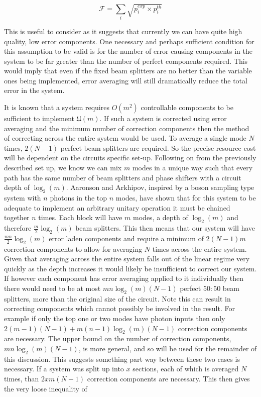 \documentclass[aps,pra,twocolumn,superscriptaddress,numerical]{revtex4-1}
\begin{document}
		\begin{equation}
			\mathcal{F}=\sum_{i}\sqrt{p_{i}^{exp}\times p_{i}^{th}}
		\end{equation}
		
		
		This is useful to consider as it suggests that currently we can have quite high quality, low error components. One necessary and perhaps sufficient condition for this assumption to be valid is for the number of error causing components in the system to be far greater than the number of perfect components required. This would imply that even if the fixed beam splitters are no better than the variable ones being implemented, error averaging will still dramatically reduce the total error in the system. 
		
		It is known \cite{reck} that a system requires $O\left(m^{2}\right)$ controllable components to be sufficient to implement $\mathfrak{U}\left(m\right)$. If such a system is corrected using error averaging and the minimum number of correction components then the method of correcting across the entire system would be used. To average a single mode $N$ times, $2\left(N-1\right)$ perfect beam splitters are required. So the precise resource cost will be dependent on the circuits specific set-up. Following on from the previously described set up, we know we can mix $m$ modes in a unique way such that every path has the same number of beam splitters and phase shifters with a circuit depth of $\log_{2}\left(m\right)$. Aaronson and Arkhipov, inspired by a boson sampling type system with $n$ photons in the top $n$ modes, have shown \cite{Boson} that for this system to be adequate to implement an arbitrary unitary operation it must be chained together $n$ times. Each block will have $m$ modes, a depth of $\log_{2}\left(m\right)$ and therefore $\frac{m}{2}\log_{2}\left(m\right)$ beam splitters.	This then means that our system will have $\frac{mn}{2}\log_{2}\left(m\right)$ error laden components and require a minimum of $2\left(N-1\right)m$ correction components to allow for averaging $N$ times across the entire system. Given that averaging across the entire system falls out of the linear regime very quickly as the depth increases it would likely	be insufficient to correct our system. If however each component has error averaging applied to it individually then there would need to be at most $mn\log_{2}\left(m\right)\left(N-1\right)$ perfect $50:50$ beam splitters, more than the original size of the circuit. Note this can result in correcting components which cannot possibly be involved	in the result. For example if only the top one or two modes have photon inputs then only $2\left(m-1\right)\left(N-1\right)+m\left(n-1\right)\log_{2}\left(m\right)\left(N-1\right)$	correction components are necessary. The upper bound on the number of correction components, $mn\log_{2}\left(m\right)\left(N-1\right)$, is more general, and so will be used for the remainder of this discussion. This suggests something part way between these two cases is necessary. If a system was split	up into $x$ sections, each of which is averaged $N$ times, than $2xm\left(N-1\right)$ correction components are necessary. This then gives the very loose inequality of 
		
\end{document}
